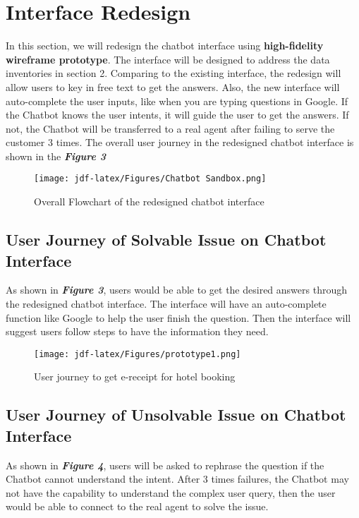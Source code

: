 \documentclass[
	letterpaper, %
]{jdf}
\begin{document}
\section{Interface Redesign}
In this section, we will redesign the chatbot interface using \textbf{high-fidelity wireframe prototype}. The interface will be designed to address the data inventories in section 2. Comparing to the existing interface, the redesign will allow users to key in free text to get the answers. Also, the new interface will auto-complete the user inputs, like when you are typing questions in Google. If the Chatbot knows the user intents, it will guide the user to get the answers. If not, the Chatbot will be transferred to a real agent after failing to serve the customer 3 times. The overall user journey in the redesigned chatbot interface is shown in the \textit{\textbf{Figure 3}}

\begin{figure}[hbt!]
	\centering
	\texttt{[image: jdf-latex/Figures/Chatbot Sandbox.png]}
	\caption{Overall Flowchart of the redesigned chatbot interface}
	\label{fig:wizard}
\end{figure}

\subsection{User Journey of Solvable Issue on Chatbot Interface}
As shown in \textit{\textbf{Figure 3}}, users would be able to get the desired answers through the redesigned chatbot interface. The interface will have an auto-complete function like Google to help the user finish the question. Then the interface will suggest users follow steps to have the information they need.

\begin{figure}[hbt!]
	\centering
	\texttt{[image: jdf-latex/Figures/prototype1.png]}
	\caption{User journey to get e-receipt for hotel booking}
	\label{fig:wizard}
\end{figure}

\subsection{User Journey of Unsolvable Issue on Chatbot Interface}
As shown in \textit{\textbf{Figure 4}}, users will be asked to rephrase the question if the Chatbot cannot understand the intent. After 3 times failures, the Chatbot may not have the capability to understand the complex user query, then the user would be able to connect to the real agent to solve the issue.
\end{document}
